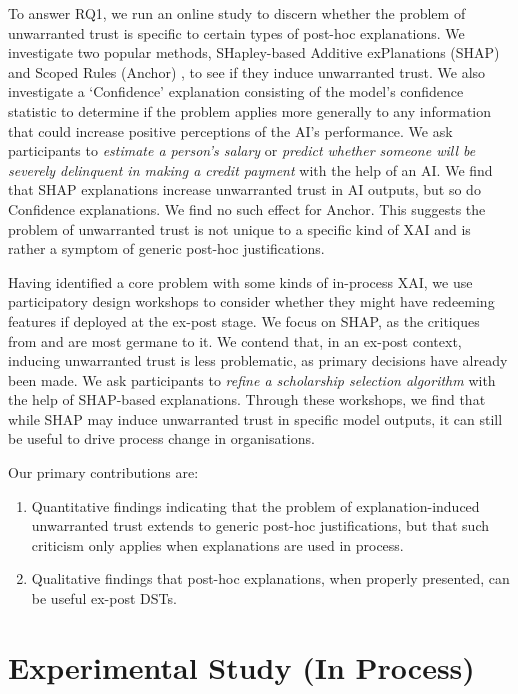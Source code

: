 To answer RQ1, we run an online study to discern whether the problem of unwarranted trust is specific to certain types of post-hoc explanations. We investigate two popular methods, SHapley-based Additive exPlanations (SHAP) \cite{lundberg_unified_2017} and Scoped Rules (Anchor) \cite{ribeiro_anchors_2018}, to see if they induce unwarranted trust. We also investigate a `Confidence' explanation consisting of the model's confidence statistic to determine if the problem applies more generally to any information that could increase positive perceptions of the AI's performance. We ask participants to \emph{estimate a person's salary} \cite{kohavi_scaling_1996} or \emph{predict whether someone will be severely delinquent in making a credit payment} \cite{GiveMeSomeCredit} with the help of an AI. We find that SHAP explanations increase unwarranted trust in AI outputs, but so do Confidence explanations. We find no such effect for Anchor. This suggests the problem of unwarranted trust is not unique to a specific kind of XAI and is rather a symptom of generic post-hoc justifications.

Having identified a core problem with some kinds of in-process XAI, we use participatory design workshops to consider whether they might have redeeming features if deployed at the ex-post stage. We focus on SHAP, as the critiques from \textcite{Lipton} and \textcite{miller_explainable_2023} are most germane to it. We contend that, in an ex-post context, inducing unwarranted trust is less problematic, as primary decisions have already been made. We ask participants to \emph{refine a scholarship selection algorithm} with the help of SHAP-based explanations. Through these workshops, we find that while SHAP may induce unwarranted trust in specific model outputs, it can still be useful to drive process change in organisations.

Our primary contributions are:

\begin{enumerate}
    \item Quantitative findings indicating that the problem of explanation-induced unwarranted trust extends to generic post-hoc justifications, but that such criticism only applies when explanations are used in process.
    \item Qualitative findings that post-hoc explanations, when properly presented, can be useful ex-post DSTs.
\end{enumerate}

\section[Experimental Study]{Experimental Study (In Process)}\label{sec:online}
